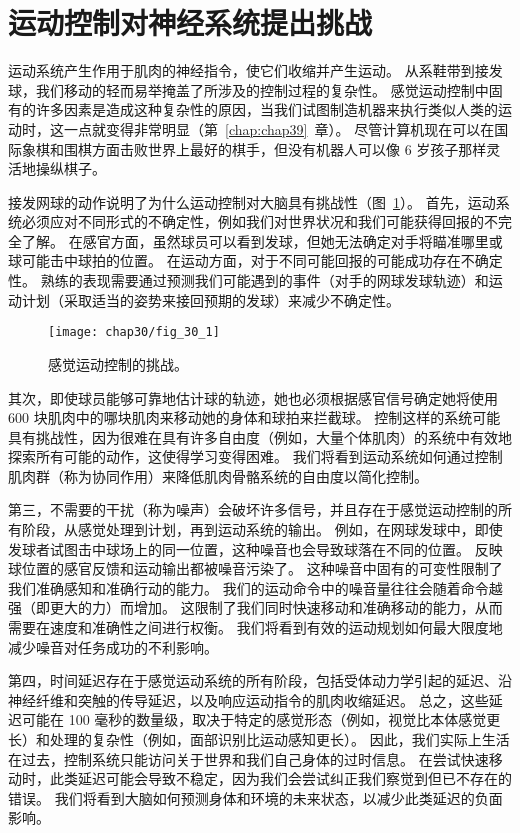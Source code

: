 \section{运动控制对神经系统提出挑战}

运动系统产生作用于肌肉的神经指令，使它们收缩并产生运动。
从系鞋带到接发球，我们移动的轻而易举掩盖了所涉及的控制过程的复杂性。
感觉运动控制中固有的许多因素是造成这种复杂性的原因，当我们试图制造机器来执行类似人类的运动时，这一点就变得非常明显（第~\ref{chap:chap39}~章）。 
尽管计算机现在可以在国际象棋和围棋方面击败世界上最好的棋手，但没有机器人可以像 6 岁孩子那样灵活地操纵棋子。


接发网球的动作说明了为什么运动控制对大脑具有挑战性（图~\ref{fig:30_1}）。
首先，运动系统必须应对不同形式的不确定性，例如我们对世界状况和我们可能获得回报的不完全了解。
在感官方面，虽然球员可以看到发球，但她无法确定对手将瞄准哪里或球可能击中球拍的位置。
在运动方面，对于不同可能回报的可能成功存在不确定性。
熟练的表现需要通过预测我们可能遇到的事件（对手的网球发球轨迹）和运动计划（采取适当的姿势来接回预期的发球）来减少不确定性。


\begin{figure}[htbp]
	\centering
	\texttt{[image: chap30/fig\_30\_1]}
	\caption{感觉运动控制的挑战。}
	\label{fig:30_1}
\end{figure}


其次，即使球员能够可靠地估计球的轨迹，她也必须根据感官信号确定她将使用 600 块肌肉中的哪块肌肉来移动她的身体和球拍来拦截球。
控制这样的系统可能具有挑战性，因为很难在具有许多自由度（例如，大量个体肌肉）的系统中有效地探索所有可能的动作，这使得学习变得困难。
我们将看到运动系统如何通过控制肌肉群（称为协同作用）来降低肌肉骨骼系统的自由度以简化控制。


第三，不需要的干扰（称为噪声）会破坏许多信号，并且存在于感觉运动控制的所有阶段，从感觉处理到计划，再到运动系统的输出。
例如，在网球发球中，即使发球者试图击中球场上的同一位置，这种噪音也会导致球落在不同的位置。
反映球位置的感官反馈和运动输出都被噪音污染了。
这种噪音中固有的可变性限制了我们准确感知和准确行动的能力。
我们的运动命令中的噪音量往往会随着命令越强（即更大的力）而增加。
这限制了我们同时快速移动和准确移动的能力，从而需要在速度和准确性之间进行权衡。
我们将看到有效的运动规划如何最大限度地减少噪音对任务成功的不利影响。


第四，时间延迟存在于感觉运动系统的所有阶段，包括受体动力学引起的延迟、沿神经纤维和突触的传导延迟，以及响应运动指令的肌肉收缩延迟。
总之，这些延迟可能在 100 毫秒的数量级，取决于特定的感觉形态（例如，视觉比本体感觉更长）和处理的复杂性（例如，面部识别比运动感知更长）。
因此，我们实际上生活在过去，控制系统只能访问关于世界和我们自己身体的过时信息。
在尝试快速移动时，此类延迟可能会导致不稳定，因为我们会尝试纠正我们察觉到但已不存在的错误。
我们将看到大脑如何预测身体和环境的未来状态，以减少此类延迟的负面影响。


